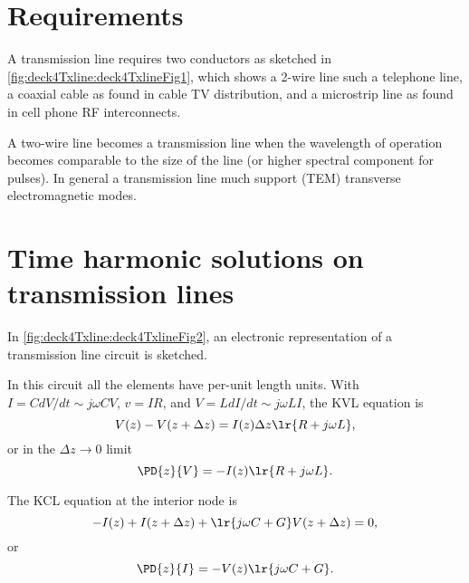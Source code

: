 %
%
\section{Requirements}
A transmission line requires two conductors as sketched in \cref{fig:deck4Txline:deck4TxlineFig1}, which shows a 2-wire line such a telephone line, a coaxial cable as found in cable TV distribution, and a microstrip line as found in cell phone RF interconnects.

A two-wire line becomes a transmission line when the wavelength of operation becomes comparable to the size of the line (or higher spectral component for pulses).  In general a transmission line much support (TEM) transverse electromagnetic modes.
\section{Time harmonic solutions on transmission lines}
In \cref{fig:deck4Txline:deck4TxlineFig2}, an electronic representation of a transmission line circuit is sketched.

In this circuit all the elements have per-unit length units.  With \( I = C dV/dt \sim j \omega C V \), \( v = I R \), and \( V = L dI/dt \sim j \omega L I \), the KVL equation is
\begin{equation}\label{eqn:uwaves4TransmissionLines:20}
V(z) - V(z + \Delta z) = I(z) \Delta z \lr{ R + j \omega L },
\end{equation}
or in the \( \Delta z \rightarrow 0 \) limit
\begin{equation}\label{eqn:uwaves4TransmissionLines:40}
\PD{z}{V} = -I(z) \lr{ R + j \omega L }.
\end{equation}

The KCL equation at the interior node is
\begin{equation}\label{eqn:uwaves4TransmissionLines:60}
-I(z) + I(z + \Delta z) + \lr{ j \omega C + G} V(z + \Delta z) = 0,
\end{equation}
or
\begin{equation}\label{eqn:uwaves4TransmissionLines:80}
\PD{z}{I} = -V(z) \lr{ j \omega C + G}.
\end{equation}

